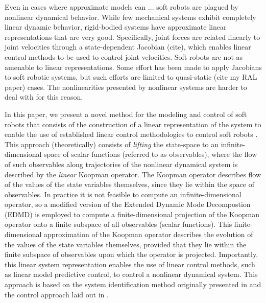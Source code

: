 Even in cases where approximate models can ... soft robots are plagued by nonlinear dynamical behavior.
While few mechanical systems exhibit completely linear dynamic behavior, rigid-bodied systems have approximate linear representations that are very good. 
Specifically, joint forces are related linearly to joint velocities through a state-dependent Jacobian (cite), which enables linear control methods to be used to control joint velocities.
Soft robots are not as amenable to linear representations.
Some effort has been made to apply Jacobians to soft robotic systems, but such efforts are limited to quasi-static (cite my RAL paper) cases.
The nonlinearities presented by nonlinear systems are harder to deal with for this reason.

In this paper, we present a novel method for the modeling and control of soft robots that consists of the construction of a linear representation of the system to enable the use of established linear control methodologies to control soft robots .
This approach (theoretically) consists of \emph{lifting} the state-space to an infinite-dimensional space of scalar functions (referred to as observables), where the flow of such observables along trajectories of the nonlinear dynamical system is described by the \emph{linear} Koopman operator.
The Koopman operator describes flow of the values of the state variables themselves, since they lie within the space of observables.
In practice it is not feasible to compute an infinite-dimensional operator, so a modified version of the Extended Dynamic Mode Decompostion (EDMD) is employed to compute a finite-dimensional projection of the Koopman operator onto a finite subspace of all observables (scalar functions).
This finite-dimensional approximation of the Koopman operator describes the evolution of the values of the state variables themselves, provided that they lie within the finite subspace of observables upon which the operator is projected.
Importantly, this linear system representation enables the use of linear control methods, such as linear model predictive control, to control a nonlinear dynamical system.  
This approach is based on the system identification method originally presented in \citet{mauroy2017koopman} and the control approach laid out in \citet{korda2018linear}.

